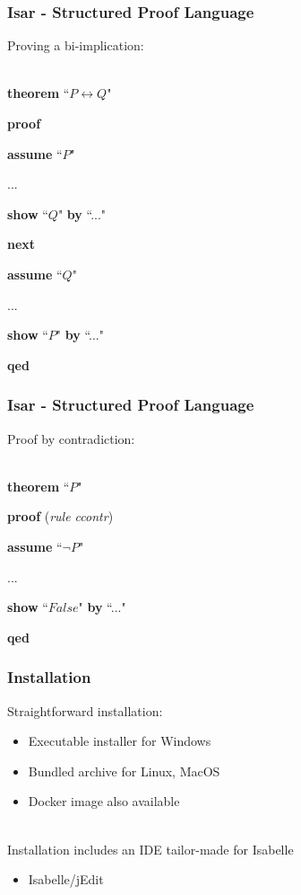 \documentclass{beamer}
\renewcommand{\indent}{\hspace*{1em}}
\begin{document}
  \begin{frame}
	\frametitle{Isar - Structured Proof Language}
	Proving a bi-implication:\\~\
	
	\textbf{theorem} ``$P \leftrightarrow Q$"
	
	\textbf{proof}
	
	\indent \textbf{assume} ``$P$"
	
	\indent ...
	
	\indent \textbf{show} ``$Q$" \textbf{by} ``..."
	
	\textbf{next}
	
	\indent \textbf{assume} ``$Q$"
	
	\indent ...
	
	\indent \textbf{show} ``$P$" \textbf{by} ``..."
	
	\textbf{qed}
  \end{frame}

  \begin{frame}
	\frametitle{Isar - Structured Proof Language}
	Proof by contradiction:\\~\
	
	\textbf{theorem} ``$P$"
	
	\textbf{proof} (\textit{rule ccontr})
	
	\indent \textbf{assume} ``$\lnot P$"
	
	\indent ...
	
	\indent \textbf{show} ``$False$" \textbf{by} ``..."
	
	\textbf{qed}
  \end{frame}

  \begin{frame}
    \frametitle{Installation}
    Straightforward installation:
    \begin{itemize}
      \item Executable installer for Windows
      \item Bundled archive for Linux, MacOS
      \item Docker image also available\\~\

    \end{itemize}

    Installation includes an IDE tailor-made for Isabelle
    \begin{itemize}
      \item Isabelle/jEdit
    \end{itemize}
  \end{frame}
\end{document}
